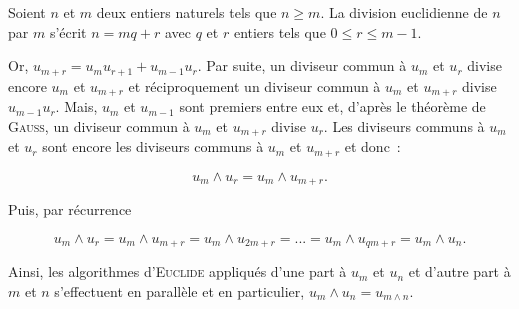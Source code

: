 {\begin{enumerate}
{Soient $n$ et $m$ deux entiers naturels tels que $n\geq m$. La division euclidienne de $n$ par $m$ s'écrit $n=mq+r$ avec $q$ et $r$ entiers tels que $0\leq r\leq m-1$.

Or, $u_{m+r}=u_mu_{r+1}+u_{m-1}u_r$. Par suite, un diviseur commun à $u_m$ et $u_r$ divise encore $u_m$ et $u_{m+r}$ et réciproquement un diviseur commun à $u_m$ et $u_{m+r}$ divise $u_{m-1}u_r$. Mais, $u_m$ et $u_{m-1}$ sont premiers entre eux et, d'après le théorème de \textsc{Gauss}, un diviseur commun à $u_m$ et $u_{m+r}$ divise $u_r$. Les diviseurs communs à $u_m$ et $u_r$ sont encore les diviseurs communs à $u_m$ et $u_{m+r}$ et donc~:

$$u_m\wedge u_r=u_m\wedge u_{m+r}.$$
 
Puis, par récurrence 

$$u_m\wedge u_r=u_m\wedge u_{m+r}=u_m\wedge u_{2m+r}=...=u_m\wedge u_{qm+r}=u_m\wedge u_n.$$

Ainsi, les algorithmes d'\textsc{Euclide} appliqués d'une part à $u_m$ et $u_n$ et d'autre part à $m$ et $n$ s'effectuent en parallèle et en particulier, $u_m\wedge u_n=u_{m\wedge n}.$}
\end{enumerate}
}

